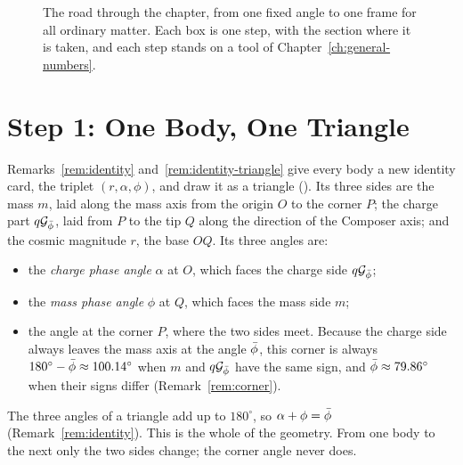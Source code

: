 \begin{figure}[tb]
\caption[The road through the chapter]{The road through the chapter, from one fixed angle to one frame for all ordinary matter. Each box is one step, with the section where it is taken, and each step stands on a tool of Chapter~\ref{ch:general-numbers}.}
\label{fig:sm-map}
\end{figure}

\section{Step 1: One Body, One Triangle}\label{sec:sm-triangle}

Remarks~\ref{rem:identity} and~\ref{rem:identity-triangle} give every body a new identity card, the triplet $(r, \alpha, \phi)$, and draw it as a triangle (). Its three sides are the mass $m$, laid along the mass axis from the origin $O$ to the corner $P$; the charge part $q\mathcal{G}_{\bar{\phi}}$, laid from $P$ to the tip $Q$ along the direction of the Composer axis; and the cosmic magnitude $r$, the base $OQ$. Its three angles are:
\begin{itemize}
  \item the \emph{charge phase angle} $\alpha$ at $O$, which faces the charge side $q\mathcal{G}_{\bar{\phi}}$;
  \item the \emph{mass phase angle} $\phi$ at $Q$, which faces the mass side $m$;
  \item the angle at the corner $P$, where the two sides meet. Because the charge side always leaves the mass axis at the angle $\bar{\phi}$, this corner is always $180^\circ - \bar{\phi} \approx 100.14^\circ$ when $m$ and $q\mathcal{G}_{\bar{\phi}}$ have the same sign, and $\bar{\phi} \approx 79.86^\circ$ when their signs differ (Remark~\ref{rem:corner}).
\end{itemize}
The three angles of a triangle add up to $180^\circ$, so $\alpha + \phi = \bar{\phi}$ (Remark~\ref{rem:identity}). This is the whole of the geometry. From one body to the next only the two sides change; the corner angle never does.

